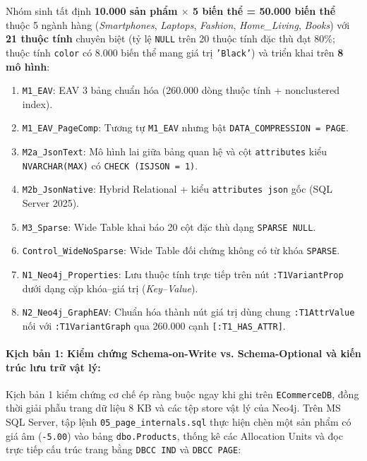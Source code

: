 Nhóm sinh tất định \textbf{10.000 sản phẩm $\times$ 5 biến thể = 50.000 biến thể} thuộc 5 ngành hàng (\textit{Smartphones}, \textit{Laptops}, \textit{Fashion}, \textit{Home\_Living}, \textit{Books}) với \textbf{21 thuộc tính} chuyên biệt (tỷ lệ \texttt{NULL} trên 20 thuộc tính đặc thù đạt 80\%; thuộc tính \texttt{color} có 8.000 biến thể mang giá trị \texttt{'Black'}) và triển khai trên \textbf{8 mô hình}:
\begin{enumerate}
  \item \texttt{M1\_EAV}: EAV 3 bảng chuẩn hóa (260.000 dòng thuộc tính + nonclustered index).
  \item \texttt{M1\_EAV\_PageComp}: Tương tự \texttt{M1\_EAV} nhưng bật \texttt{DATA\_COMPRESSION = PAGE}.
  \item \texttt{M2a\_JsonText}: Mô hình lai giữa bảng quan hệ và cột \texttt{attributes} kiểu \texttt{NVARCHAR(MAX)} có \texttt{CHECK (ISJSON = 1)}.
  \item \texttt{M2b\_JsonNative}: Hybrid Relational + kiểu \texttt{attributes json} gốc (SQL Server 2025).
  \item \texttt{M3\_Sparse}: Wide Table khai báo 20 cột đặc thù dạng \texttt{SPARSE NULL}.
  \item \texttt{Control\_WideNoSparse}: Wide Table đối chứng không có từ khóa \texttt{SPARSE}.
  \item \texttt{N1\_Neo4j\_Properties}: Lưu thuộc tính trực tiếp trên nút \texttt{:T1VariantProp} dưới dạng cặp khóa--giá trị (\textit{Key--Value}).
  \item \texttt{N2\_Neo4j\_GraphEAV}: Chuẩn hóa thành nút giá trị dùng chung \texttt{:T1AttrValue} nối với \texttt{:T1VariantGraph} qua 260.000 cạnh \texttt{[:T1\_HAS\_ATTR]}.
\end{enumerate}

\paragraph{Kịch bản 1: Kiểm chứng Schema-on-Write vs. Schema-Optional và kiến trúc lưu trữ vật lý:}
Kịch bản 1 kiểm chứng cơ chế ép ràng buộc ngay khi ghi trên \texttt{ECommerceDB}, đồng thời giải phẫu trang dữ liệu 8 KB và các tệp store vật lý của Neo4j. Trên MS SQL Server, tập lệnh \texttt{05\_page\_internals.sql} thực hiện chèn một sản phẩm có giá âm (\texttt{-5.00}) vào bảng \texttt{dbo.Products}, thống kê các Allocation Units và đọc trực tiếp cấu trúc trang bằng \texttt{DBCC IND} và \texttt{DBCC PAGE}:

